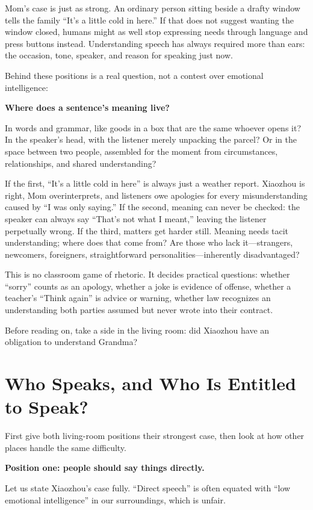 Mom's case is just as strong. An ordinary person sitting beside a drafty window tells the family ``It's a little cold in here.'' If that does not suggest wanting the window closed, humans might as well stop expressing needs through language and press buttons instead. Understanding speech has always required more than ears: the occasion, tone, speaker, and reason for speaking just now.

Behind these positions is a real question, not a contest over emotional intelligence:

\textbf{Where does a sentence's meaning live?}

In words and grammar, like goods in a box that are the same whoever opens it? In the speaker's head, with the listener merely unpacking the parcel? Or in the space between two people, assembled for the moment from circumstances, relationships, and shared understanding?

If the first, ``It's a little cold in here'' is always just a weather report. Xiaozhou is right, Mom overinterprets, and listeners owe apologies for every misunderstanding caused by ``I was only saying.'' If the second, meaning can never be checked: the speaker can always say ``That's not what I meant,'' leaving the listener perpetually wrong. If the third, matters get harder still. Meaning needs tacit understanding; where does that come from? Are those who lack it---strangers, newcomers, foreigners, straightforward personalities---inherently disadvantaged?

This is no classroom game of rhetoric. It decides practical questions: whether ``sorry'' counts as an apology, whether a joke is evidence of offense, whether a teacher's ``Think again'' is advice or warning, whether law recognizes an understanding both parties assumed but never wrote into their contract.

Before reading on, take a side in the living room: did Xiaozhou have an obligation to understand Grandma?

\section{Who Speaks, and Who Is Entitled to Speak?}
First give both living-room positions their strongest case, then look at how other places handle the same difficulty.

\textbf{Position one: people should say things directly.}

Let us state Xiaozhou's case fully. ``Direct speech'' is often equated with ``low emotional intelligence'' in our surroundings, which is unfair.

